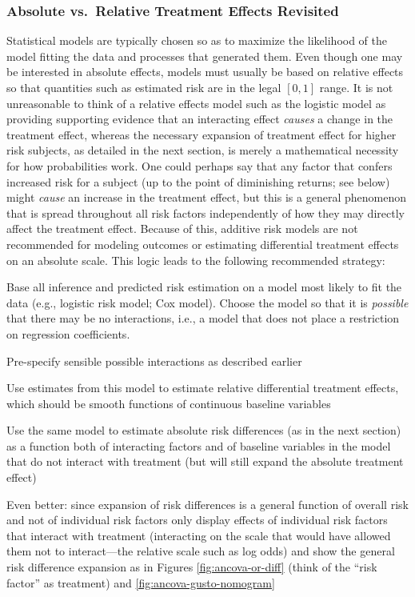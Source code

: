 \subsubsection{Absolute vs.\ Relative Treatment Effects Revisited}
Statistical models are typically chosen so as to maximize the
likelihood of the model fitting the data and processes that generated
them.  Even though one may be interested in absolute effects, models
must usually be based on relative effects so that quantities such as
estimated risk are in the legal $[0,1]$ range.  It is not unreasonable
to think of a relative effects model such as the logistic model as
providing supporting evidence that an interacting effect \emph{causes}
a change in the treatment effect, whereas the necessary expansion of
treatment effect for higher risk subjects, as detailed in the next
section, is merely a mathematical necessity for how probabilities
work.  One could perhaps say that any factor that confers increased
risk for a subject (up to the point of diminishing returns; see below)
might \emph{cause} an increase in the treatment effect, but this is a
general phenomenon that is spread throughout all risk factors
independently of how they may directly affect the treatment effect.
Because of this, additive risk models are not recommended for modeling
outcomes or estimating differential treatment effects on an absolute
scale.  This logic leads to the following recommended strategy:
\be
\item Base all inference and predicted risk estimation on a model most likely to fit the data (e.g., logistic risk model; Cox model).  Choose the model so that it is \emph{possible} that there may be no interactions, i.e., a model that does not place a restriction on regression coefficients.
\item Pre-specify sensible possible interactions as described earlier
\item Use estimates from this model to estimate relative differential treatment effects, which should be smooth functions of continuous baseline variables
\item Use the same model to estimate absolute risk differences (as in the next section) as a function both of interacting factors and of baseline variables in the model that do not interact with treatment (but will still expand the absolute treatment effect)
\item Even better: since expansion of risk differences is a general function of overall risk and not of individual risk factors only display effects of individual risk factors that interact with treatment (interacting on the scale that would have allowed them not to interact---the relative scale such as log odds) and show the general risk difference expansion as in Figures \ref{fig:ancova-or-diff} (think of the ``risk factor'' as treatment) and \ref{fig:ancova-gusto-nomogram}
\ee

